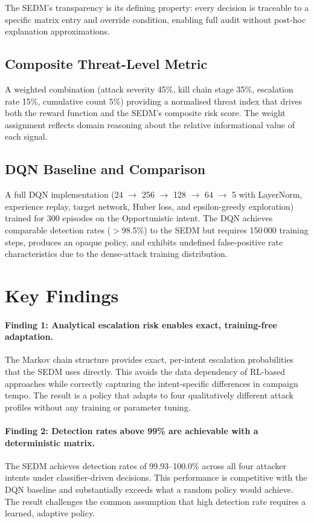The SEDM's transparency is its defining property: every decision is traceable
to a specific matrix entry and override condition, enabling full audit without
post-hoc explanation approximations.

\subsection{Composite Threat-Level Metric}

A weighted combination (attack severity 45\%, kill chain stage 35\%,
escalation rate 15\%, cumulative count 5\%) providing a normalised threat
index that drives both the reward function and the SEDM's composite risk score.
The weight assignment reflects domain reasoning about the relative informational
value of each signal.

\subsection{DQN Baseline and Comparison}

A full DQN implementation (24 $\to$ 256 $\to$ 128 $\to$ 64 $\to$ 5 with
LayerNorm, experience replay, target network, Huber loss, and epsilon-greedy
exploration) trained for 300 episodes on the Opportunistic intent.
The DQN achieves comparable detection rates ($>$98.5\%) to the SEDM but requires
150\,000 training steps, produces an opaque policy, and exhibits undefined
false-positive rate characteristics due to the dense-attack training distribution.

\section{Key Findings}

\paragraph{Finding 1: Analytical escalation risk enables exact, training-free adaptation.}
The Markov chain structure provides exact, per-intent escalation probabilities
that the SEDM uses directly.
This avoids the data dependency of RL-based approaches while correctly
capturing the intent-specific differences in campaign tempo.
The result is a policy that adapts to four qualitatively different attack
profiles without any training or parameter tuning.

\paragraph{Finding 2: Detection rates above 99\% are achievable with a deterministic matrix.}
The SEDM achieves detection rates of 99.93--100.0\% across all four attacker
intents under classifier-driven decisions.
This performance is competitive with the DQN baseline and substantially
exceeds what a random policy would achieve.
The result challenges the common assumption that high detection rate requires
a learned, adaptive policy.

